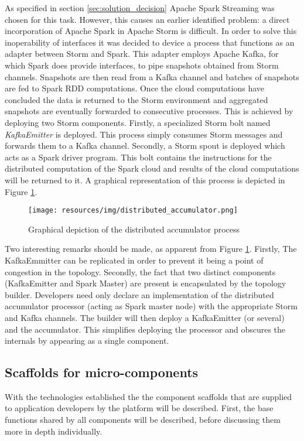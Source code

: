 As specified in section \ref{sec:solution_decision} Apache Spark Streaming was chosen for this task. However, this causes an earlier identified problem: a direct incorporation of Apache Spark in Apache Storm is difficult. In order to solve this inoperability of interfaces it was decided to device a process that functions as an adapter between Storm and Spark. This adapter employs Apache Kafka, for which Spark does provide interfaces, to pipe snapshots obtained from Storm channels. Snapshots are then read from a Kafka channel and batches of snapshots are fed to Spark RDD computations. Once the cloud computations have concluded the data is returned to the Storm environment and aggregated snapshots are eventually forwarded to consecutive processes. This is achieved by deploying two Storm components. Firstly, a specialized Storm bolt named \emph{KafkaEmitter} is deployed. This process simply consumes Storm messages and forwards them to a Kafka channel. Secondly, a Storm spout is deployed which acts as a Spark driver program. This bolt contains the instructions for the distributed computation of the Spark cloud and results of the cloud computations will be returned to it. A graphical representation of this process is depicted in Figure \ref{fig:distributed_accumulator}.

\begin{figure}
\centering
\texttt{[image: resources/img/distributed\_accumulator.png]}
\caption{Graphical depiction of the distributed accumulator process}
\label{fig:distributed_accumulator}
\end{figure}

Two interesting remarks should be made, as apparent from Figure \ref{fig:distributed_accumulator}. Firstly, The KafkaEmmitter can be replicated in order to prevent it being a point of congestion in the topology. Secondly, the fact that two distinct components (KafkaEmitter and Spark Master) are present is encapsulated by the topology builder. Developers need only declare an implementation of the distributed accumulator processor (acting as Spark master node) with the appropriate Storm and Kafka channels. The builder will then deploy a KafkaEmitter (or several) and the accumulator. This simplifies deploying the processor and obscures the internals by appearing as a single component.

\subsection{Scaffolds for micro-components}
With the technologies established the the component scaffolds that are supplied to application developers by the platform will be described. First, the base functions shared by all components will be described, before discussing them more in depth individually.

